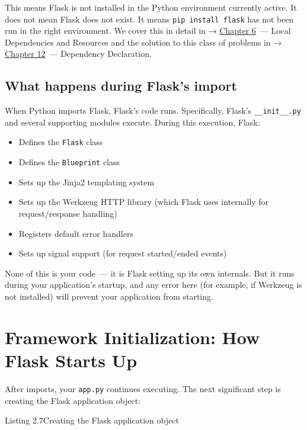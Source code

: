 \noindent{}This means Flask is not installed in the Python environment currently active. It does not mean Flask does not exist. It means \texttt{pip\ install\ flask} has not been run in the right environment. We cover this in detail in → \hyperref[ch:06-local-dependencies]{Chapter 6}~--- Local Dependencies and Resources and the solution to this class of problems in → \hyperref[ch:12-dependency-declaration]{Chapter 12}~--- Dependency Declaration.

\subsection*{What happens during Flask's import}\label{02-runtime-initialization:what-happens-during-flasks-import}

When Python imports Flask, Flask's code runs. Specifically, Flask's \texttt{\_\_init\_\_.py} and several supporting modules execute. During this execution, Flask:

\begin{itemize}
\tightlist
\item
  Defines the \texttt{Flask} class
\item
  Defines the \texttt{Blueprint} class
\item
  Sets up the Jinja2 templating system
\item
  Sets up the Werkzeug HTTP library (which Flask uses internally for request/response handling)
\item
  Registers default error handlers
\item
  Sets up signal support (for request started/ended events)
\end{itemize}

\noindent{}None of this is your code~--- it is Flask setting up its own internals. But it runs during your application's startup, and any error here (for example, if Werkzeug is not installed) will prevent your application from starting.

\setcounter{section}{4}
\section{Framework Initialization: How Flask Starts Up}\label{02-runtime-initialization:25-framework-initialization-how-flask-starts-up}

After imports, your \texttt{app.py} continues executing. The next significant step is creating the Flask application object:

\begin{codeboxcap}[short]{\textcolor{accent}{Listing 2.7}\enspace Creating the Flask application object}

\begin{Shaded}
\begin{Highlighting}[]

\OperatorTok{=}\NormalTok{)}
\end{Highlighting}
\end{Shaded}

\end{codeboxcap}

